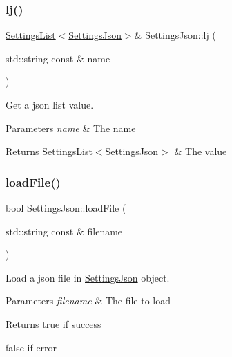 \subsubsection{\texorpdfstring{lj()}{lj()}\hspace{0.1cm}{\footnotesize\ttfamily [2/2]}}
{\footnotesize\ttfamily \hyperlink{class_settings_list}{Settings\+List}$<$\hyperlink{class_settings_json}{Settings\+Json}$>$\& Settings\+Json\+::lj (\begin{DoxyParamCaption}\item[{std\+::string const \&}]{name }\end{DoxyParamCaption})\hspace{0.3cm}{\ttfamily [inline]}}



Get a json list value. 


\begin{DoxyParams}{Parameters}
{\em name} & The name \\
\hline
\end{DoxyParams}
\begin{DoxyReturn}{Returns}
Settings\+List$<$\+Settings\+Json$>$ \& The value 
\end{DoxyReturn}
\mbox{\label{class_settings_json_ab57c9f2b4353baf2a7668eed3c45e05c}} 
\subsubsection{\texorpdfstring{load\+File()}{loadFile()}}
{\footnotesize\ttfamily bool Settings\+Json\+::load\+File (\begin{DoxyParamCaption}\item[{std\+::string const \&}]{filename }\end{DoxyParamCaption})}



Load a json file in \hyperlink{class_settings_json}{Settings\+Json} object. 


\begin{DoxyParams}{Parameters}
{\em filename} & The file to load \\
\hline
\end{DoxyParams}
\begin{DoxyReturn}{Returns}
true if success 

false if error
\end{DoxyReturn}

